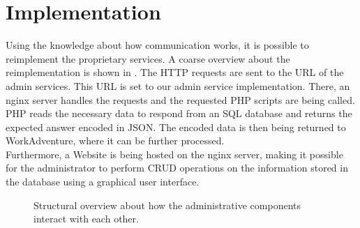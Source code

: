 \documentclass[a4paper]{scrartcl}
\begin{document}
	\section{Implementation}
	Using the knowledge about how communication works, it is possible to reimplement the proprietary services. A coarse overview about the reimplementation is shown in . The HTTP requests are sent to the URL of the admin services. This URL is set to our admin service implementation. There, an nginx server handles the requests and  the requested PHP scripts are being called. PHP reads the necessary data to respond from an SQL database and returns the expected answer encoded in JSON. The encoded data is then being returned to WorkAdventure, where it can be further processed.\\
	Furthermore, a Website is being hosted on the nginx server, making it possible for the administrator to perform CRUD operations on the information stored in the database using a graphical user interface.
	\begin{figure}[htb]
		\centering
		\caption{Structural overview about how the administrative components interact with each other.}
		\label{structural_overview}
	\end{figure}
\end{document}
